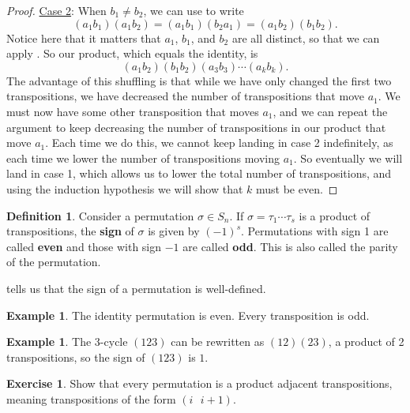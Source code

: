 \documentclass[12pt]{report}
\numberwithin{equation}{section}
\numberwithin{theorem}{chapter}
\theoremstyle{definition}
\newtheorem{definition}[theorem]{Definition}
\newtheorem{example}[theorem]{Example}
\newtheorem{exercise}{Exercise}
\newtheorem*{basic properties}{Basic Properties}
\newtheorem*{Important Remark}{Important Remark}
\begin{document}
\begin{proof}
\underline{Case 2}: When $b_1 \neq b_2$, we can use  to write 
$$(a_1 b_1) (a_1 b_2) = (a_1 b_1) (b_2 a_1) = (a_1b_2)(b_1b_2).$$
Notice here that it matters that $a_1$, $b_1$, and $b_2$ are all distinct, so that we can apply . So our product, which equals the identity, is
$$(a_1 b_2)(b_1 b_2)(a_3 b_3) \cdots (a_k b_k).$$
The advantage of this shuffling is that while we have only changed the first two transpositions, we have decreased the number of transpositions that move $a_1$. We must now have some other transposition that moves $a_1$, and we can repeat the argument to keep decreasing the number of transpositions in our product that move $a_1$. Each time we do this, we cannot keep landing in case 2 indefinitely, as each time we lower the number of transpositions moving $a_1$. So eventually we will land in case 1, which allows us to lower the total number of transpositions, and using the induction hypothesis we will show that $k$ must be even.
\end{proof}


\begin{definition}
Consider a permutation $\sigma \in S_n$.
If $\sigma = \tau_1 \cdots \tau_s$ is a product of transpositions, the {\bf sign} of $\sigma$ is given by $(-1)^s$. Permutations with sign 1 are called {\bf even} and those with sign $-1$ are called {\bf odd}. This is also called the parity of the permutation.
\end{definition}

 tells us that the sign of a permutation is well-defined.

\begin{example}
	The identity permutation is even. Every transposition is odd.
\end{example}


\begin{example}
	The 3-cycle $(123)$ can be rewritten as $(12)(23)$, a product of 2 transpositions, so the sign of $(123)$ is $1$.
\end{example}



\begin{exercise} 
Show that every permutation is a product adjacent transpositions, meaning transpositions of the form $(i \,\,\,\, i + 1)$.
\end{exercise}


\newpage
\end{document}
